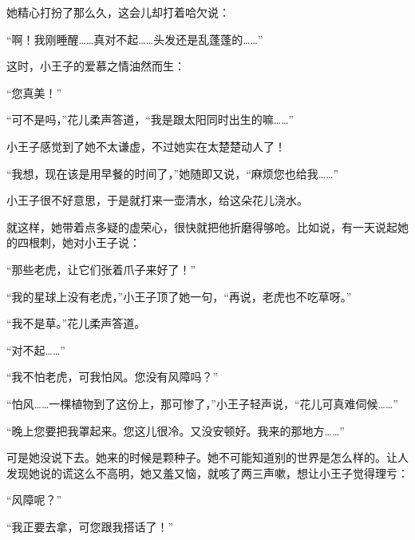 她精心打扮了那么久，这会儿却打着哈欠说：

“啊！我刚睡醒\ldots{}\ldots{}真对不起\ldots{}\ldots{}头发还是乱蓬蓬的\ldots{}\ldots{}”

这时，小王子的爱慕之情油然而生：

“您真美！”

{\startalignment[center]
 \stopalignment}

“可不是吗，”花儿柔声答道，“我是跟太阳同时出生的嘛\ldots{}\ldots{}”

小王子感觉到了她不太谦虚，不过她实在太楚楚动人了！

{\startalignment[center]
 \stopalignment}

“我想，现在该是用早餐的时间了，”她随即又说，“麻烦您也给我\ldots{}\ldots{}”

小王子很不好意思，于是就打来一壶清水，给这朵花儿浇水。

就这样，她带着点多疑的虚荣心，很快就把他折磨得够呛。比如说，有一天说起她的四根刺，她对小王子说：

“那些老虎，让它们张着爪子来好了！”

“我的星球上没有老虎，”小王子顶了她一句，“再说，老虎也不吃草呀。”

“我不是草。”花儿柔声答道。

{\startalignment[center]
 \stopalignment}

“对不起\ldots{}\ldots{}”

“我不怕老虎，可我怕风。您没有风障吗？”

“怕风\ldots{}\ldots{}一棵植物到了这份上，那可惨了，”小王子轻声说，“花儿可真难伺候\ldots{}\ldots{}”

“晚上您要把我罩起来。您这儿很冷。又没安顿好。我来的那地方\ldots{}\ldots{}”

可是她没说下去。她来的时候是颗种子。她不可能知道别的世界是怎么样的。让人发现她说的谎这么不高明，她又羞又恼，就咳了两三声嗽，想让小王子觉得理亏：

“风障呢？”

“我正要去拿，可您跟我搭话了！”

{\startalignment[center]
 \stopalignment}

